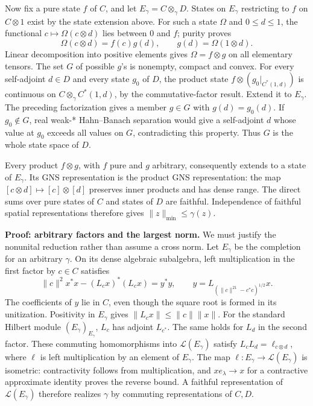 \documentclass[
  11pt,
]{article}
\newcounter{none} %
\begin{document}
Now fix a pure state \(f\) of \(C\), and let
\(E_\gamma=C\otimes_\gamma D\). States on \(E_\gamma\) restricting to
\(f\) on \(C\otimes1\) exist by the state extension above. For such a
state \(\Omega\) and \(0\leq d\leq1\), the functional
\(c\mapsto\Omega(c\otimes d)\) lies between \(0\) and \(f\); purity
proves \[
\Omega(c\otimes d)=f(c)g(d),\qquad
g(d)=\Omega(1\otimes d).
\] Linear decomposition into positive elements gives
\(\Omega=f\otimes g\) on all elementary tensors. The set \(G\) of
possible \(g\)'s is nonempty, compact and convex. For every self-adjoint
\(d\in D\) and every state \(g_0\) of \(D\), the product state
\(f\otimes(g_0|_{C^*(1,d)})\) is continuous on
\(C\otimes_\gamma C^*(1,d)\), by the commutative-factor result. Extend
it to \(E_\gamma\). The preceding factorization gives a member
\(g\in G\) with \(g(d)=g_0(d)\). If \(g_0\notin G\), real weak-*
Hahn--Banach separation would give a self-adjoint \(d\) whose value at
\(g_0\) exceeds all values on \(G\), contradicting this property. Thus
\(G\) is the whole state space of \(D\).

Every product \(f\otimes g\), with \(f\) pure and \(g\) arbitrary,
consequently extends to a state of \(E_\gamma\). Its GNS representation
is the product GNS representation: the map
\([c\otimes d]\mapsto[c]\otimes[d]\) preserves inner products and has
dense range. The direct sums over pure states of \(C\) and states of
\(D\) are faithful. Independence of faithful spatial representations
therefore gives \(\|z\|_{\min}\leq\gamma(z)\).

\textbf{Proof: arbitrary factors and the largest norm.} We must justify
the nonunital reduction rather than assume a cross norm. Let
\(E_\gamma\) be the completion for an arbitrary \(\gamma\). On its dense
algebraic subalgebra, left multiplication in the first factor by
\(c\in C\) satisfies \[
\|c\|^2 x^*x-(L_cx)^*(L_cx)=y^*y,\qquad
y=L_{(\|c\|^21-c^*c)^{1/2}}x .
\] The coefficients of \(y\) lie in \(C\), even though the square root
is formed in its unitization. Positivity in \(E_\gamma\) gives
\(\|L_cx\|\leq\|c\|\|x\|\). For the standard Hilbert module
\((E_\gamma)_{E_\gamma}\), \(L_c\) has adjoint \(L_{c^*}\). The same
holds for \(L_d\) in the second factor. These commuting homomorphisms
into \(\mathcal L(E_\gamma)\) satisfy \(L_cL_d=\ell_{c\otimes d}\),
where \(\ell\) is left multiplication by an element of \(E_\gamma\). The
map \(\ell:E_\gamma\to\mathcal L(E_\gamma)\) is isometric: contractivity
follows from multiplication, and \(xe_\lambda\to x\) for a contractive
approximate identity proves the reverse bound. A faithful representation
of \(\mathcal L(E_\gamma)\) therefore realizes \(\gamma\) by commuting
representations of \(C,D\).
\end{document}
